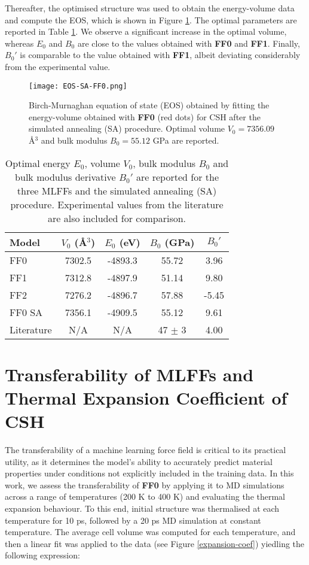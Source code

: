 Thereafter, the optimised structure was used to obtain the energy-volume data and compute the EOS, which is shown in Figure \ref{fig:eos-sa-ff0}. The optimal parameters are reported in Table \ref{tab:bulk-params}. We observe a significant increase in the optimal volume, whereas $E_0$ and $B_0$ are close to the values obtained with \textbf{FF0} and \textbf{FF1}. Finally, $B_0'$ is comparable to the value obtained with \textbf{FF1}, albeit deviating considerably from the experimental value.
\begin{figure}[H]
    \centering
    \texttt{[image: EOS-SA-FF0.png]}
    \caption{
    Birch-Murnaghan equation of state (EOS) obtained by fitting the energy-volume obtained with \textbf{FF0} (red dots) for CSH after the simulated annealing (SA) procedure. Optimal volume $V_0=7356.09$ \AA$^3$ and bulk modulus $B_0=55.12$ GPa are reported.
    }
    \label{fig:eos-sa-ff0}
\end{figure}

\begin{table}[h]
\centering
\caption{
    Optimal energy $E_0$, volume $V_0$, bulk modulus $B_0$ and bulk modulus derivative $B_0'$ are reported for the three MLFFs and the simulated annealing (SA) procedure. Experimental values from the literature are also included for comparison.}
\label{tab:bulk-params}
\begin{tabular}{lcccc}
\toprule
\midrule
\textbf{Model} & $V_0$ (\AA$^3$) & $E_0$ (eV) & $B_0$ (GPa) & $B_0'$ \\
\midrule
FF0       & 7302.5   & -4893.3  & 55.72      & 3.96   \\
FF1       & 7312.8   & -4897.9  & 51.14      & 9.80   \\
FF2       & 7276.2   & -4896.7  & 57.88      & -5.45  \\
FF0 SA    & 7356.1   & -4909.5  & 55.12      & 9.61   \\
Literature & N/A     & N/A      & 47 $\pm$ 3 & 4.00      \\
\midrule
\bottomrule
\end{tabular}
\end{table}



\section{Transferability of MLFFs and Thermal Expansion Coefficient of CSH}
\label{sec:transferability}
The transferability of a machine learning force field is critical to its practical utility, as it determines the model's ability to accurately predict material properties under conditions not explicitly included in the training data. In this work, we assess the transferability of \textbf{FF0} by applying it to MD simulations across a range of temperatures (200 K to 400 K) and evaluating the thermal expansion behaviour. To this end, initial structure was thermalised at each temperature for 10 ps, followed by a 20 ps MD simulation at constant temperature. The average cell volume was computed for each temperature, and then a linear fit\supercite{Xu2007} was applied to the data (see Figure \ref{expansion-coef}) yiedling the following expression:

